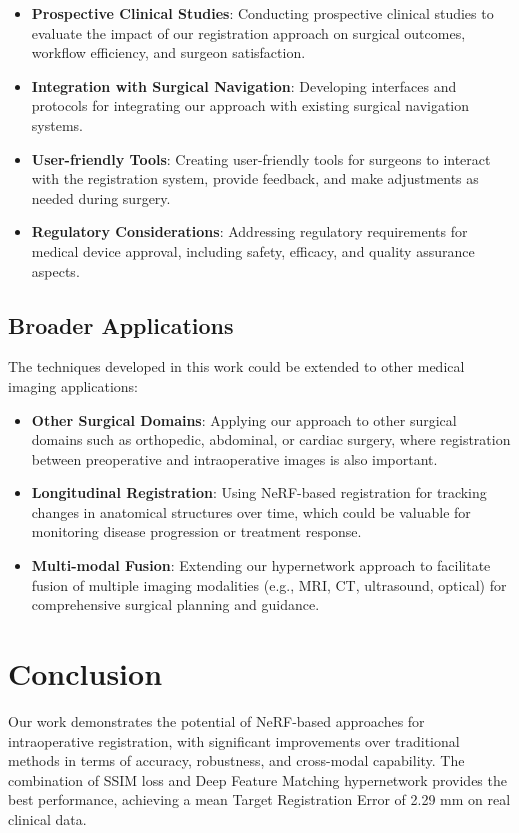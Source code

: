 \begin{itemize}
    \item \textbf{Prospective Clinical Studies}: Conducting prospective clinical studies to evaluate the impact of our registration approach on surgical outcomes, workflow efficiency, and surgeon satisfaction.
    
    \item \textbf{Integration with Surgical Navigation}: Developing interfaces and protocols for integrating our approach with existing surgical navigation systems.
    
    \item \textbf{User-friendly Tools}: Creating user-friendly tools for surgeons to interact with the registration system, provide feedback, and make adjustments as needed during surgery.
    
    \item \textbf{Regulatory Considerations}: Addressing regulatory requirements for medical device approval, including safety, efficacy, and quality assurance aspects.
\end{itemize}

\subsection{Broader Applications}
The techniques developed in this work could be extended to other medical imaging applications:

\begin{itemize}
    \item \textbf{Other Surgical Domains}: Applying our approach to other surgical domains such as orthopedic, abdominal, or cardiac surgery, where registration between preoperative and intraoperative images is also important.
    
    \item \textbf{Longitudinal Registration}: Using NeRF-based registration for tracking changes in anatomical structures over time, which could be valuable for monitoring disease progression or treatment response.
    
    \item \textbf{Multi-modal Fusion}: Extending our hypernetwork approach to facilitate fusion of multiple imaging modalities (e.g., MRI, CT, ultrasound, optical) for comprehensive surgical planning and guidance.
\end{itemize}

\section{Conclusion}
Our work demonstrates the potential of NeRF-based approaches for intraoperative registration, with significant improvements over traditional methods in terms of accuracy, robustness, and cross-modal capability. The combination of SSIM loss and Deep Feature Matching hypernetwork provides the best performance, achieving a mean Target Registration Error of 2.29 mm on real clinical data.

